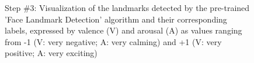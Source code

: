 \begin{figure}[H]
  \hfill
  \caption[ER pipeline step \#3: Landmark detection]{Step \#3: Visualization of the landmarks detected by the pre-trained 'Face Landmark Detection' algorithm \citep{Kazemi:2014:ShapePredictor} and their corresponding labels, expressed by valence (V) and arousal (A) as values ranging from -1 (V: very negative; A: very calming) and +1 (V: very positive; A: very exciting)}
  \label{fig:MethodologyLandmarks}
\end{figure}

